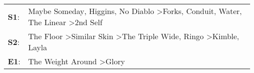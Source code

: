 \begin{supertabular}{p{0.03\textwidth}p{0.92\textwidth}}
 \textbf{S1}:  &  Maybe Someday\textsuperscript{}, \enspace Higgins\textsuperscript{}, \enspace No Diablo\textsuperscript{} \textgreater \enspace Forks\textsuperscript{}, \enspace Conduit\textsuperscript{}, \enspace Water\textsuperscript{}, \enspace The Linear\textsuperscript{} \textgreater \enspace 2nd Self\textsuperscript{}  \enspace  \\
 \textbf{S2}:  &                                                            The Floor\textsuperscript{} \textgreater \enspace Similar Skin\textsuperscript{} \textgreater \enspace The Triple Wide\textsuperscript{}, \enspace Ringo\textsuperscript{} \textgreater \enspace Kimble\textsuperscript{}, \enspace Layla\textsuperscript{}  \enspace  \\
 \textbf{E1}:  &                                                                                                                                                                                                                                      The Weight Around\textsuperscript{} \textgreater \enspace Glory\textsuperscript{}  \enspace  \\
\end{supertabular}
